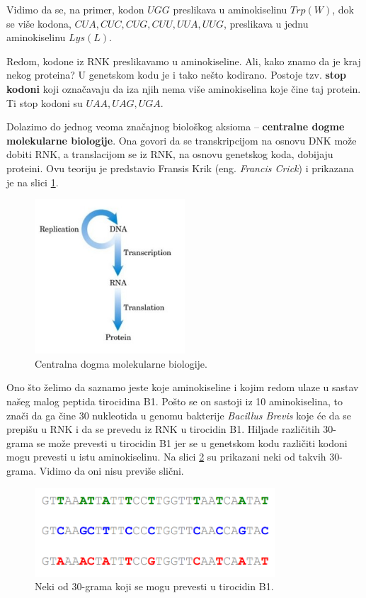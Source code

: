 Vidimo da se, na primer, kodon $UGG$ preslikava u aminokiselinu $Trp (W)$, dok se više kodona, $CUA, CUC, CUG, CUU, UUA, UUG$, preslikava u jednu aminokiselinu $Lys (L)$. 

Redom, kodone iz RNK preslikavamo u aminokiseline. Ali, kako znamo da je kraj nekog proteina? U genetskom kodu je i tako nešto kodirano. Postoje tzv. \textbf{stop kodoni} koji označavaju da iza njih nema više aminokiselina koje čine taj protein. Ti stop kodoni su $UAA, UAG, UGA$. 

\newpage


Dolazimo do jednog veoma značajnog biološkog aksioma -- \textbf{centralne dogme molekularne biologije}. Ona govori da se transkripcijom na osnovu DNK može dobiti RNK, a translacijom se iz RNK, na osnovu genetskog koda, dobijaju proteini. Ovu teoriju je predstavio Fransis Krik (eng. \textit{Francis Crick}) i prikazana je na slici \ref{slika:centralnaDogma}.
\begin{figure}[h!]
	\centering
	\includegraphics[width=0.5\textwidth]{poglavlja/4/slike/centralnaDog.jpg}
	\caption{Centralna dogma molekularne biologije.}
	\label{slika:centralnaDogma}
\end{figure} 



Ono što želimo da saznamo jeste koje aminokiseline i kojim redom ulaze u sastav našeg malog peptida tirocidina B1. Pošto se on sastoji iz 10 aminokiselina, to znači da ga čine 30 nukleotida u genomu bakterije \textit{Bacillus Brevis} koje će da se prepišu u RNK i da se prevedu iz RNK u tirocidin B1. Hiljade različitih $30$-grama se može prevesti u tirocidin B1 jer se u genetskom kodu različiti kodoni mogu prevesti u istu aminokiselinu. Na slici \ref{slika:30grami} su prikazani neki od takvih $30$-grama. Vidimo da oni nisu previše slični.
\begin{figure}[h!]
	\centering
	\includegraphics[width=0.8\textwidth]{poglavlja/4/slike/30grami.png}
	\caption{Neki od $30$-grama koji se mogu prevesti u tirocidin B1.}
	\label{slika:30grami}
\end{figure} 
\noindent

